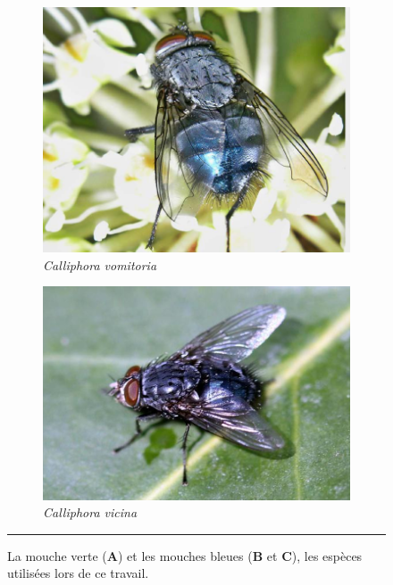 \begin{figure}[ht]
\begin{subfigure}{0.265\textwidth}
			\includegraphics[width=\linewidth]{Figures/Calliphora-vomitoria-03.pdf}
			\caption{\textit{Calliphora vomitoria}}
				\label{sub:calliphora}
		\end{subfigure}
        \begin{subfigure}{0.29\textwidth}
			\includegraphics[width=\linewidth]{Figures/vicina.png}
			\caption{\textit{Calliphora vicina}}
				\label{sub:calliphoravic}
		\end{subfigure}
		\rule{35em}{0.5pt}
        \caption[Species]{La mouche verte (\textbf{A}) et les mouches bleues (\textbf{B} et \textbf{C}), les espèces utilisées lors de ce travail.}		
			\label{fig:mouche}
	\end{figure}

